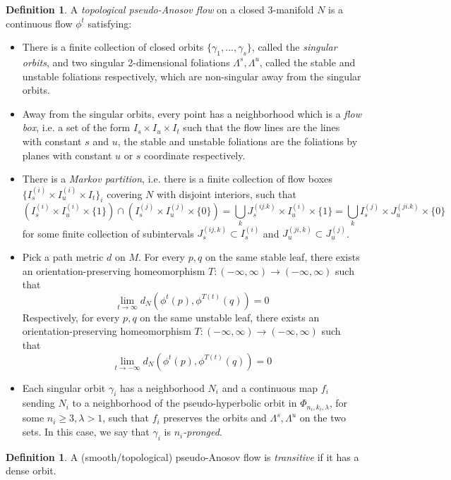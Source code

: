 \documentclass[12pt]{amsart}
\theoremstyle{definition}
\newtheorem{defn}[thm]{Definition}
\numberwithin{equation}{section}
\begin{document}
\begin{defn}
A \textit{topological pseudo-Anosov flow} on a closed 3-manifold $N$ is a continuous flow $\phi^t$ satisfying:
\begin{itemize}
    \item There is a finite collection of closed orbits $\{\gamma_1, ..., \gamma_s \}$, called the \textit{singular orbits}, and two singular 2-dimensional foliations $\Lambda^s, \Lambda^u$, called the stable and unstable foliations respectively, which are non-singular away from the singular orbits.
    \item Away from the singular orbits, every point has a neighborhood which is a \textit{flow box}, i.e. a set of the form $I_s \times I_u \times I_t$ such that the flow lines are the lines with constant $s$ and $u$, the stable and unstable foliations are the foliations by planes with constant $u$ or $s$ coordinate respectively.
    \item There is a \textit{Markov partition}, i.e. there is a finite collection of flow boxes $\{ I^{(i)}_s \times I^{(i)}_u \times I_t \}_i$ covering $N$ with disjoint interiors, such that $$(I^{(i)}_s \times I^{(i)}_u \times \{1\}) \cap (I^{(j)}_s \times I^{(j)}_u \times \{0\}) = \bigcup_k J^{(ij.k)}_s \times I^{(i)}_u \times \{1\} = \bigcup_k I^{(j)}_s \times J^{(ji.k)}_u \times \{0\}$$ for some finite collection of subintervals $J^{(ij,k)}_s \subset I^{(i)}_s$ and $J^{(ji,k)}_u \subset J^{(j)}_u$.
    \item Pick a path metric $d$ on $M$. For every $p,q$ on the same stable leaf, there exists an orientation-preserving homeomorphism $T:(-\infty,\infty) \to (-\infty,\infty)$ such that $$\lim_{t \to \infty} d_N(\phi^t(p),\phi^{T(t)}(q))=0$$ Respectively, for every $p,q$ on the same unstable leaf, there exists an orientation-preserving homeomorphism $T:(-\infty,\infty) \to (-\infty,\infty)$ such that $$\lim_{t \to -\infty} d_N(\phi^t(p),\phi^{T(t)}(q))=0$$ 
    \item Each singular orbit $\gamma_i$ has a neighborhood $N_i$ and a continuous map $f_i$ sending $N_i$ to a neighborhood of the pseudo-hyperbolic orbit in $\Phi_{n_i, k_i, \lambda}$, for some $n_i \geq 3, \lambda>1$, such that $f_i$ preserves the orbits and $\Lambda^s, \Lambda^u$ on the two sets. In this case, we say that $\gamma_i$ is \textit{$n_i$-pronged}.
\end{itemize}
\end{defn}

\begin{defn}
A (smooth/topological) pseudo-Anosov flow is \textit{transitive} if it has a dense orbit.
\end{defn}
\end{document}
